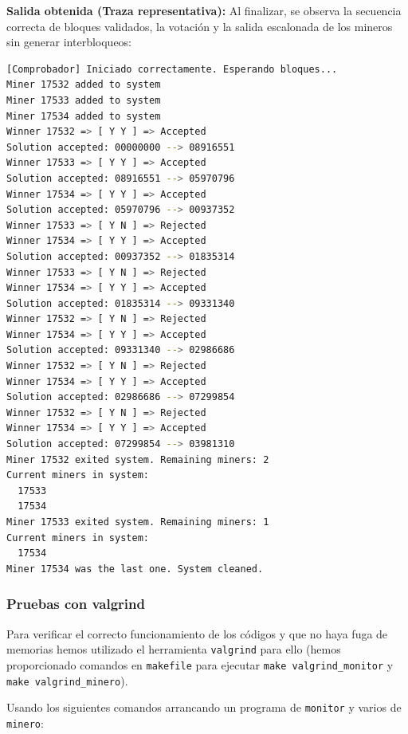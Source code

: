 \documentclass[12pt,a4paper]{article}
\begin{document}
\textbf{Salida obtenida (Traza representativa):}
Al finalizar, se observa la secuencia correcta de bloques validados, la votación y la salida escalonada de los mineros sin generar interbloqueos:
\begin{lstlisting}[language=bash]
[Comprobador] Iniciado correctamente. Esperando bloques...
Miner 17532 added to system
Miner 17533 added to system
Miner 17534 added to system
Winner 17532 => [ Y Y ] => Accepted
Solution accepted: 00000000 --> 08916551
Winner 17533 => [ Y Y ] => Accepted
Solution accepted: 08916551 --> 05970796
Winner 17534 => [ Y Y ] => Accepted
Solution accepted: 05970796 --> 00937352
Winner 17533 => [ Y N ] => Rejected
Winner 17534 => [ Y Y ] => Accepted
Solution accepted: 00937352 --> 01835314
Winner 17533 => [ Y N ] => Rejected
Winner 17534 => [ Y Y ] => Accepted
Solution accepted: 01835314 --> 09331340
Winner 17532 => [ Y N ] => Rejected
Winner 17534 => [ Y Y ] => Accepted
Solution accepted: 09331340 --> 02986686
Winner 17532 => [ Y N ] => Rejected
Winner 17534 => [ Y Y ] => Accepted
Solution accepted: 02986686 --> 07299854
Winner 17532 => [ Y N ] => Rejected
Winner 17534 => [ Y Y ] => Accepted
Solution accepted: 07299854 --> 03981310
Miner 17532 exited system. Remaining miners: 2
Current miners in system:
  17533
  17534
Miner 17533 exited system. Remaining miners: 1
Current miners in system:
  17534
Miner 17534 was the last one. System cleaned.
\end{lstlisting}
\subsubsection{Pruebas con valgrind}
Para verificar el correcto funcionamiento de los códigos y que no haya fuga de memorias hemos utilizado el herramienta \texttt{valgrind} para ello (hemos proporcionado comandos en \texttt{makefile} para ejecutar \texttt{make valgrind\_monitor} y \texttt{make valgrind\_minero}).

Usando los siguientes comandos arrancando un programa de \texttt{monitor} y varios de \texttt{minero}:
\end{document}
